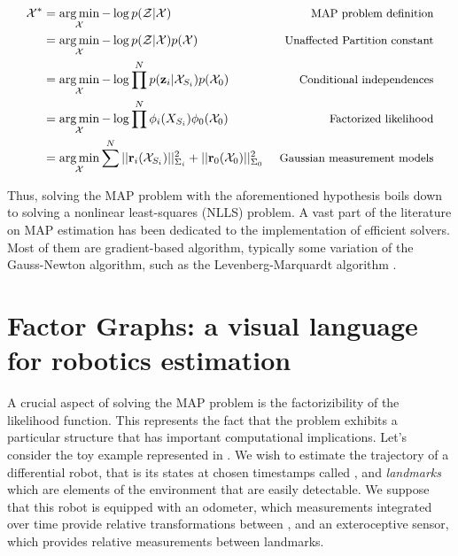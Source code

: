 %
\begin{align}
    \mathcal{X}^* 
    &= \operatorname*{arg\,min}_{\mathcal{X}} - \log p(\mathcal{Z} | \mathcal{X}) ~&\mbox{\small MAP problem definition}\\
    &= \operatorname*{arg\,min}_{\mathcal{X}} - \log p(\mathcal{Z} | \mathcal{X}) p(\mathcal{X}) ~&\mbox{\small Unaffected Partition constant}\\
    &= \operatorname*{arg\,min}_{\mathcal{X}} - \log \prod^{N} p({\bf z}_i | \mathcal{X}_{S_i}) p(\mathcal{X}_0) ~&\mbox{\small Conditional independences}\\
    &= \operatorname*{arg\,min}_{\mathcal{X}} - \log \prod^{N} \phi_i(X_{S_i}) \phi_0(\mathcal{X}_{0}) ~&\mbox{\small Factorized likelihood}\\
    &= \operatorname*{arg\,min}_{\mathcal{X}} \sum^{N} ||{\bf r}_i(\mathcal{X}_{S_i})||_{\Sigma_i}^2 + ||{\bf r}_0(\mathcal{X}_{0})||_{\Sigma_0}^2 ~&\mbox{\small Gaussian measurement models}\\
\end{align}

Thus, solving the MAP problem with the aforementioned hypothesis boils down to solving a nonlinear least-squares (NLLS) problem. 
A vast part of the literature on MAP estimation has been dedicated to the implementation of efficient solvers. Most of them are 
gradient-based algorithm, typically some variation of the Gauss-Newton algorithm, such as the Levenberg-Marquardt algorithm \cite{boyd2004convex}.


\section{Factor Graphs: a visual language for robotics estimation}
A crucial aspect of solving the MAP problem is the factorizibility of the likelihood function. This represents the fact that the problem
exhibits a particular structure that has important computational implications. Let's consider the toy example represented in . 
We wish to estimate the trajectory of a differential robot, that is its states at chosen timestamps called \textit{\keyframes}, and \textit{landmarks} which are elements of the 
environment that are easily detectable. We suppose that this robot is equipped with an odometer, which measurements integrated over time provide relative 
transformations between \keyframes, and an exteroceptive sensor, which provides relative measurements between \keyframes landmarks.

